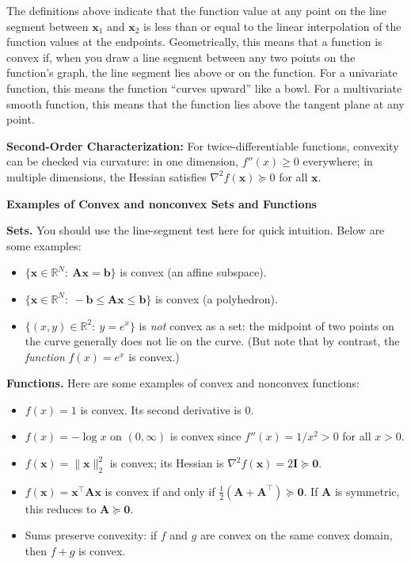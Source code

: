 The definitions above indicate that the function value at any point on the line segment between $\mathbf{x}_1$ and $\mathbf{x}_2$ is less than or equal to the linear interpolation of the function values at the endpoints. Geometrically, this means that a function is convex if, when you draw a line segment between any two points on the function's graph, the line segment lies above or on the function. For a univariate function, this means the function ``curves upward'' like a bowl. For a multivariate smooth function, this means that the function lies above the tangent plane at any point.


\textbf{Second-Order Characterization:}
For twice-differentiable functions, convexity can be checked via curvature: in one dimension, $f''(x)\ge 0$ everywhere; in multiple dimensions, the Hessian satisfies $\nabla^2 f(\mathbf{x}) \succeq 0$ for all $\mathbf{x}$.

\begin{exampleBox}
    \textbf{Examples of Convex and nonconvex Sets and Functions}

    \textbf{Sets.} You should use the line-segment test here for quick intuition. Below are some examples:
    \begin{itemize}
        \item \(\{\mathbf{x}\in\mathbb{R}^N:\ \mathbf{A}\mathbf{x}=\mathbf{b}\}\) is convex (an affine subspace).
        \item \(\{\mathbf{x}\in\mathbb{R}^N:\ -\mathbf{b}\le \mathbf{A}\mathbf{x}\le \mathbf{b}\}\) is convex (a polyhedron).
        \item \(\{(x,y)\in\mathbb{R}^2:\ y=e^{x}\}\) is \emph{not} convex as a set: the midpoint of two points on the curve generally does not lie on the curve. (But note that by contrast, the \emph{function} $f(x) = e^{x}$ is convex.)
    \end{itemize}

    \textbf{Functions.} Here are some examples of convex and nonconvex functions:
    \begin{itemize}
        \item \(f(x)=1\) is convex. Its second derivative is \(0\).
        \item \(f(x)=-\log x\) on \((0,\infty)\) is convex since \(f''(x)=1/x^{2}>0\) for all \(x > 0\).
        \item \(f(\mathbf{x})=\|\mathbf{x}\|_2^2\) is convex; its Hessian is \(\nabla^2 f(\mathbf{x})=2\mathbf{I}\succeq \mathbf{0}\).
        \item \(f(\mathbf{x})=\mathbf{x}^\top \mathbf{A}\mathbf{x}\) is convex if and only if \(\frac{1}{2}\left(\mathbf{A}+\mathbf{A}^\top\right)\succeq \mathbf{0}\). If $\mathbf{A}$ is symmetric, this reduces to $\mathbf{A}\succeq \mathbf{0}$. 
        \item Sums preserve convexity: if \(f\) and \(g\) are convex on the same convex domain, then \(f+g\) is convex.
    \end{itemize}
    \end{exampleBox}

